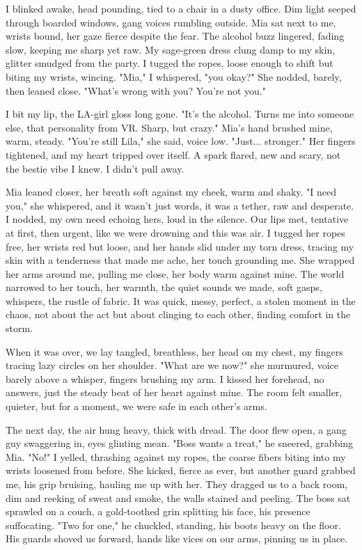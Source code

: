 \documentclass[12pt,oneside]{book} %
\begin{document}
I blinked awake, head pounding, tied to a chair in a dusty office. Dim light seeped through boarded windows, gang voices rumbling outside. Mia sat next to me, wrists bound, her gaze fierce despite the fear. The alcohol buzz lingered, fading slow, keeping me sharp yet raw. My sage-green dress clung damp to my skin, glitter smudged from the party. I tugged the ropes, loose enough to shift but biting my wrists, wincing. "Mia," I whispered, "you okay?" She nodded, barely, then leaned close. "What’s wrong with you? You’re not you."

I bit my lip, the LA-girl gloss long gone. "It’s the alcohol. Turns me into someone else, that personality from VR. Sharp, but crazy." Mia’s hand brushed mine, warm, steady. "You’re still \textnormal{Lila}," she said, voice low. "Just... stronger." Her fingers tightened, and my heart tripped over itself. A spark flared, new and scary, not the bestie vibe I knew. I didn’t pull away.

Mia leaned closer, her breath soft against my cheek, warm and shaky. "I need you," she whispered, and it wasn’t just words, it was a tether, raw and desperate. I nodded, my own need echoing hers, loud in the silence. Our lips met, tentative at first, then urgent, like we were drowning and this was air. I tugged her ropes free, her wrists red but loose, and her hands slid under my torn dress, tracing my skin with a tenderness that made me ache, her touch grounding me. She wrapped her arms around me, pulling me close, her body warm against mine. The world narrowed to her touch, her warmth, the quiet sounds we made, soft gasps, whispers, the rustle of fabric. It was quick, messy, perfect, a stolen moment in the chaos, not about the act but about clinging to each other, finding comfort in the storm.

When it was over, we lay tangled, breathless, her head on my chest, my fingers tracing lazy circles on her shoulder. "What are we now?" she murmured, voice barely above a whisper, fingers brushing my arm. I kissed her forehead, no answers, just the steady beat of her heart against mine. The room felt smaller, quieter, but for a moment, we were safe in each other’s arms.

The next day, the air hung heavy, thick with dread. The door flew open, a gang guy swaggering in, eyes glinting mean. "Boss wants a treat," he sneered, grabbing Mia. "No!" I yelled, thrashing against my ropes, the coarse fibers biting into my wrists loosened from before. She kicked, fierce as ever, but another guard grabbed me, his grip bruising, hauling me up with her. They dragged us to a back room, dim and reeking of sweat and smoke, the walls stained and peeling. The boss sat sprawled on a couch, a gold-toothed grin splitting his face, his presence suffocating. "Two for one," he chuckled, standing, his boots heavy on the floor. His guards shoved us forward, hands like vices on our arms, pinning us in place.
\end{document}
